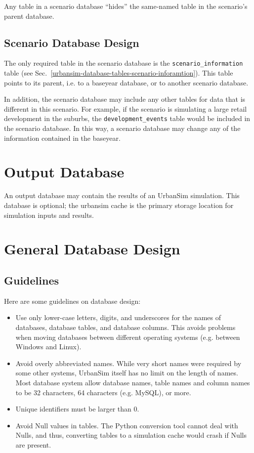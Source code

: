 Any table in a scenario database ``hides'' the same-named table in the
scenario's parent database.

\subsection{Scenario Database Design}

The only required table in the scenario database is the
\verb|scenario_information| table (see Sec.~\ref{urbansim-database-tables-scenario-inforamtion}).
This table points to its parent, i.e. to a baseyear database, or
to another scenario database.

In addition, the scenario database may include any other tables for data that
is different in this scenario. For example, if the scenario is simulating a
large retail development in the suburbs, the \verb|development_events| table
would be included in the scenario database.  In this way, a scenario database
may change any of the information contained in the baseyear.

\section{Output Database}

An output database may contain the results of an UrbanSim simulation.  This
database is optional; the urbansim cache is the primary storage location for
simulation inputs and results.

\section{General Database Design}

\subsection{Guidelines}

Here are some guidelines on database design:

\begin{itemize}
\item Use only lower-case letters, digits, and underscores for the names of
databases, database tables, and database columns. This avoids problems when
moving databases between different operating systems (e.g. between Windows and
Linux). 
\item Avoid overly abbreviated names.  While very short names were required by
some other systems, UrbanSim itself has no limit on the length of names. Most
database system allow database names, table names and column names to be 32
characters, 64 characters (e.g. MySQL), or more.
\item Unique identifiers must be larger than 0. 
\item Avoid Null values in tables. The Python conversion tool cannot deal with 
Nulls, and thus, converting tables to a simulation cache would crash if Nulls are present.  
\end{itemize}

